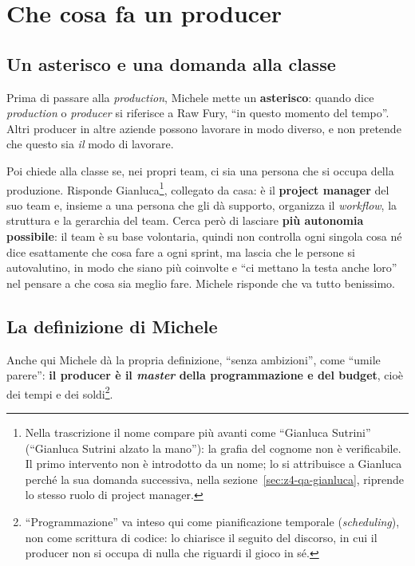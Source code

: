 \section{Che cosa fa un producer}
\label{sec:z4-producer}

\subsection{Un asterisco e una domanda alla classe}

Prima di passare alla \emph{production}, Michele mette un
\textbf{asterisco}: quando dice \emph{production} o \emph{producer} si
riferisce a Raw Fury, ``in questo momento del tempo''. Altri producer in altre
aziende possono lavorare in modo diverso, e non pretende che questo sia
\emph{il} modo di lavorare.

Poi chiede alla classe se, nei propri team, ci sia una persona che si occupa
della produzione. Risponde Gianluca\footnote{Nella trascrizione il nome
compare più avanti come ``Gianluca Sutrini'' (``Gianluca Sutrini alzato la
mano''): la grafia del cognome non è verificabile. Il primo intervento non è
introdotto da un nome; lo si attribuisce a Gianluca perché la sua domanda
successiva, nella sezione~\ref{sec:z4-qa-gianluca}, riprende lo stesso ruolo
di project manager.}, collegato da casa: è il \textbf{project manager} del
suo team e, insieme a una persona che gli dà supporto, organizza il
\emph{workflow}, la struttura e la gerarchia del team. Cerca però di lasciare
\textbf{più autonomia possibile}: il team è su base volontaria, quindi non
controlla ogni singola cosa né dice esattamente che cosa fare a ogni sprint,
ma lascia che le persone si autovalutino, in modo che siano più coinvolte e
``ci mettano la testa anche loro'' nel pensare a che cosa sia meglio fare.
Michele risponde che va tutto benissimo.

\subsection{La definizione di Michele}

Anche qui Michele dà la propria definizione, ``senza ambizioni'', come
``umile parere'': \textbf{il producer è il \emph{master} della programmazione
e del budget}, cioè dei tempi e dei soldi\footnote{``Programmazione'' va inteso
qui come pianificazione temporale (\emph{scheduling}), non come scrittura di
codice: lo chiarisce il seguito del discorso, in cui il producer non si occupa
di nulla che riguardi il gioco in sé.}.

